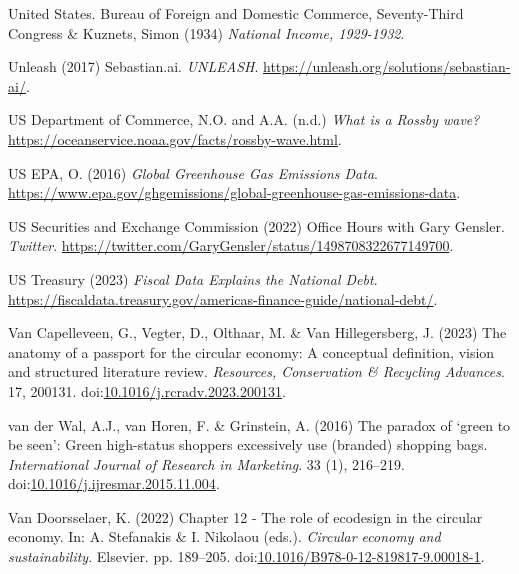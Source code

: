 \documentclass[
  letterpaper,
  DIV=11,
  numbers=noendperiod]{scrartcl}
\newlength{\cslhangindent}
\newenvironment{CSLReferences}[2] %
 {\begin{list}{}{%
  \setlength{\itemindent}{0pt}
  \setlength{\leftmargin}{0pt}
  \setlength{\parsep}{0pt}
  \ifodd #1
   \setlength{\leftmargin}{\cslhangindent}
   \setlength{\itemindent}{-1\cslhangindent}
  \fi
  \setlength{\itemsep}{#2\baselineskip}}}
 {\end{list}}
\begin{document}
\begin{CSLReferences}{0}{1}
United States. Bureau of Foreign and Domestic Commerce, Seventy-Third
Congress \& Kuznets, Simon (1934) \emph{National {Income}, 1929-1932}.

Unleash (2017) Sebastian.ai. \emph{UNLEASH}.
\url{https://unleash.org/solutions/sebastian-ai/}.

US Department of Commerce, N.O. and A.A. (n.d.) \emph{What is a {Rossby}
wave?} \url{https://oceanservice.noaa.gov/facts/rossby-wave.html}.

US EPA, O. (2016) \emph{Global {Greenhouse Gas Emissions Data}}.
\url{https://www.epa.gov/ghgemissions/global-greenhouse-gas-emissions-data}.

US Securities and Exchange Commission (2022) Office {Hours} with {Gary
Gensler}. \emph{Twitter}.
\url{https://twitter.com/GaryGensler/status/1498708322677149700}.

US Treasury (2023) \emph{Fiscal {Data Explains} the {National Debt}}.
\url{https://fiscaldata.treasury.gov/americas-finance-guide/national-debt/}.

Van Capelleveen, G., Vegter, D., Olthaar, M. \& Van Hillegersberg, J.
(2023) The anatomy of a passport for the circular economy: A conceptual
definition, vision and structured literature review. \emph{Resources,
Conservation \& Recycling Advances}. 17, 200131.
doi:\href{https://doi.org/10.1016/j.rcradv.2023.200131}{10.1016/j.rcradv.2023.200131}.

van der Wal, A.J., van Horen, F. \& Grinstein, A. (2016) The paradox of
{`green to be seen'}: {Green} high-status shoppers excessively use
(branded) shopping bags. \emph{International Journal of Research in
Marketing}. 33 (1), 216--219.
doi:\href{https://doi.org/10.1016/j.ijresmar.2015.11.004}{10.1016/j.ijresmar.2015.11.004}.

Van Doorsselaer, K. (2022) Chapter 12 - {The} role of ecodesign in the
circular economy. In: A. Stefanakis \& I. Nikolaou (eds.).
\emph{Circular economy and sustainability}. Elsevier. pp. 189--205.
doi:\href{https://doi.org/10.1016/B978-0-12-819817-9.00018-1}{10.1016/B978-0-12-819817-9.00018-1}.


\end{CSLReferences}
\end{document}
